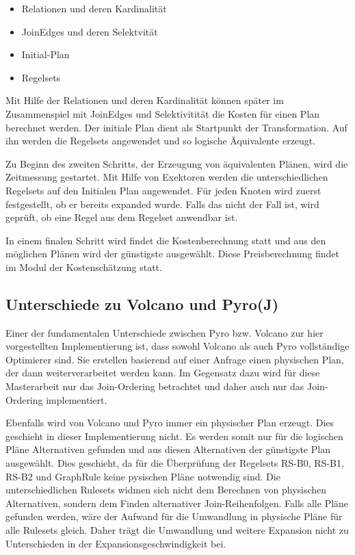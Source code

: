 \begin{itemize}
\item Relationen und deren Kardinalität 
\item JoinEdges und deren Selektvität
\item Initial-Plan
\item Regelsets
\end{itemize}

Mit Hilfe der Relationen und deren Kardinalität können später im Zusammenspiel mit JoinEdges und Selektivitität die Kosten für einen Plan berechnet werden. Der initiale Plan dient als Startpunkt der Transformation. Auf ihn werden die Regelsets angewendet und so logische  Äquivalente erzeugt.

Zu Beginn des zweiten Schritts, der Erzeugung von äquivalenten Plänen, wird die Zeitmessung gestartet.  Mit Hilfe von Exektoren werden die unterschiedlichen Regelsets auf den Initialen Plan angewendet. Für jeden Knoten wird zuerst festgestellt, ob er bereits expanded wurde. Falls das nicht der Fall ist, wird geprüft, ob eine Regel aus dem Regelset anwendbar ist. 

In einem finalen Schritt wird findet die Kostenberechnung statt und aus den möglichen Plänen wird der günstigste ausgewählt. Diese Preisberechnung findet im Modul der Kostenschätzung statt.


\subsection{Unterschiede zu Volcano und Pyro(J)}

Einer der fundamentalen Unterschiede zwischen Pyro bzw. Volcano zur hier vorgestellten Implementierung ist, dass sowohl Volcano als auch Pyro vollständige Optimierer sind. Sie erstellen basierend auf einer Anfrage einen physischen Plan, der dann weiterverarbeitet werden kann. Im Gegensatz dazu wird für diese Masterarbeit nur das Join-Ordering betrachtet und daher auch nur das Join-Ordering implementiert.


Ebenfalls wird von Volcano und Pyro immer ein physischer Plan erzeugt. Dies geschieht in dieser Implementierung nicht. Es werden somit nur für die logischen Pläne Alternativen gefunden und aus diesen Alternativen der günstigste Plan ausgewählt. Dies geschieht, da für die Überprüfung der Regelsets RS-B0, RS-B1, RS-B2 und GraphRule keine pysischen Pläne notwendig sind. Die unterschiedlichen Rulesets widmen sich nicht dem Berechnen von physischen Alternativen, sondern dem Finden alternativer Join-Reihenfolgen. Falls alle Pläne gefunden werden, wäre der Aufwand für die Umwandlung in physische Pläne für alle Rulesets gleich. Daher trägt die Umwandlung und weitere Expansion nicht zu Unterschieden in der Expansionsgeschwindigkeit bei.

